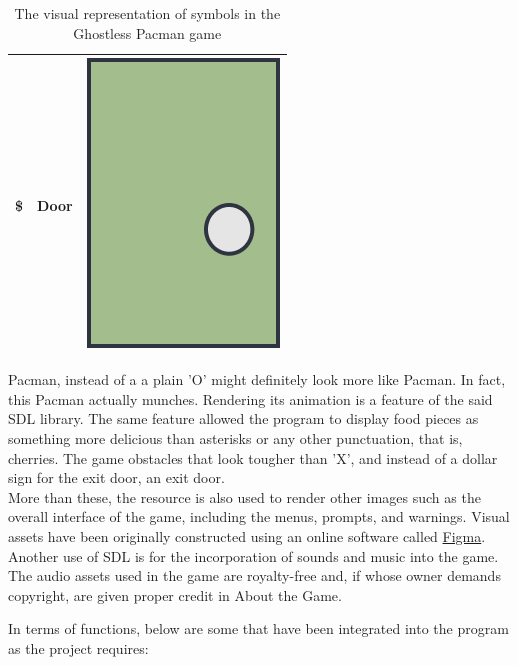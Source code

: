 \begin{table}[H]
\begin{tabular}{ c c c }
        \$ & Door & \includegraphics[scale=0.1]{assets/door_sample.png}\\
        \hline
    \end{tabular}
    \caption{The visual representation of symbols in the Ghostless Pacman game}
    \label{tab:1}
\end{table}

Pacman, instead of a a plain 'O' might definitely look more like Pacman. In fact, this Pacman actually munches. Rendering its animation is a feature of the said SDL
library. The same feature allowed the program to display food pieces as
something more delicious than asterisks or any other punctuation, that is,
cherries. The game obstacles that look tougher than 'X', and instead of a dollar
sign for the exit door, an exit door.\\

More than these, the resource is also used to render other images such as the overall interface of the game, including the menus, prompts, and warnings. Visual assets have been originally constructed using an online software called \href{https://www.figma.com/}{Figma}.\\

Another use of SDL is for the incorporation of sounds and music into the game. The audio assets used in the game are royalty-free and, if whose owner demands copyright, are given proper credit in About the Game.

In terms of functions, below are some that have been integrated into the program as the project requires:

